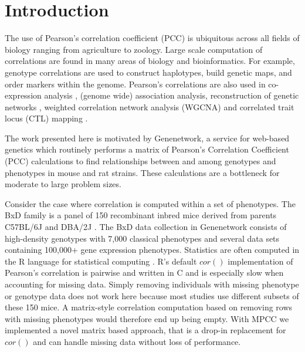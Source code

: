 \documentclass{bioinfo}
\begin{document}
\maketitle


\section{Introduction}

The use of Pearson's correlation coefficient (PCC) is ubiquitous
across all fields of biology ranging from agriculture to
zoology. Large scale computation of correlations are found in many
areas of biology and bioinformatics.  For example, genotype
correlations are used to construct haplotypes, build genetic maps, and
order markers within the genome. Pearson's correlations are also used
in co-expression analysis \citep{Tesson:2010}, (genome wide)
association analysis, reconstruction of genetic
networks \citep{Fukushima:2013}, weighted correlation network analysis
(WGCNA) \citep{Horvath:2008} and correlated trait locus (CTL)
mapping \citep{Arends2016a}.



\enlargethispage{12pt}

The work presented here is motivated by Genenetwork, a service for
web-based genetics \citep{Sloan2016} which routinely performs a matrix
of Pearson's Correlation Coefficient (PCC) calculations to find
relationships between and among genotypes and phenotypes in mouse and
rat strains. These calculations are a bottleneck for moderate to large
problem sizes.



Consider the case where correlation is computed within a set of
phenotypes. The BxD family is a panel of 150 recombinant inbred mice
derived from parents C57BL/6J and DBA/2J \citep{Ashbrook:2019}. The
BxD data collection in Genenetwork consists of high-density genotypes
with 7,000 classical phenotypes and several data sets containing
100,000+ gene expression phenotypes. Statistics are often computed in
the R language for statistical computing \citep{R:2005}. R's default
$cor()$ implementation of Pearson's correlation is pairwise and
written in C and is especially slow when accounting for missing
data. Simply removing individuals with missing phenotype or genotype
data does not work here because most studies use different subsets of
these 150 mice. A matrix-style correlation computation based on
removing rows with missing phenotypes would therefore end up being
empty.  With MPCC we implemented a novel matrix based approach, that
is a drop-in replacement for $cor()$ and can handle missing data
without loss of performance.
\end{document}
